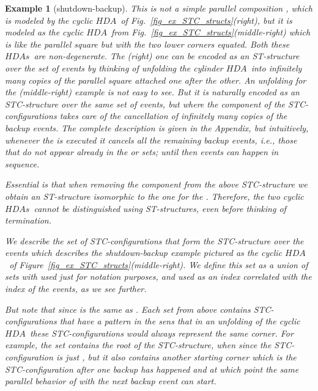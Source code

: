 \documentclass[submission,copyright,creativecommons]{eptcs}
\newtheorem{example}[theorem]{Example}
\newcommand\HDA{\ensuremath{\mathit{HDA}}}
\newcommand\HDAs{\ensuremath{\mathit{HDAs}}}
\begin{document}
\begin{example}[shutdown-backup]
This is not a simple parallel composition , which is modeled by the cyclic \HDA\ of Fig.~\ref{fig_ex_STC_structs}(right), but it is modeled as the cyclic \HDA\ from Fig.~\ref{fig_ex_STC_structs}(middle-right) which is like the parallel square but with the two lower corners   equated.
Both these \HDAs\ are non-degenerate. The (right) one can be encoded as an ST-structure over the set of events  by thinking of unfolding the cylinder \HDA\ into infinitely many copies of the parallel square attached one after the other.
An unfolding for the (middle-right) example is not easy to see. But it is naturally encoded as an STC-structure over the same set of events, but where the  component of the STC-configurations takes care of the cancellation of infinitely many copies of the backup events. The complete description is given in the Appendix, but intuitively, whenever the  is executed it cancels all the remaining backup events, i.e., those that do not appear already in the  or  sets; until then  events can happen in sequence.

Essential is that when removing the  component from the above STC-structure we obtain an ST-structure isomorphic to the one for the . Therefore, the two cyclic \HDAs\ cannot be distinguished using ST-structures, even before thinking of termination.
 


We describe the set of STC-configurations that form the STC-structure over the events  which describes the shutdown-backup example pictured as the cyclic \HDA\ of Figure~\ref{fig_ex_STC_structs}(middle-right). We define this set as a union of sets  with  used just for notation purposes, and  used as an index correlated with the index of the  events, as we see further.











But note that  since  is the same as .
Each set from above contains STC-configurations that have a pattern in the sens that in an unfolding of the cyclic \HDA\ these STC-configurations would always represent the same corner. For example, the set  contains the root of the STC-structure, when  since the STC-configuration is just , but it also contains another starting corner  which is the STC-configuration after one backup has happened and at which point the same parallel behavior of  with the next backup event can start.


\end{example}
\end{document}
